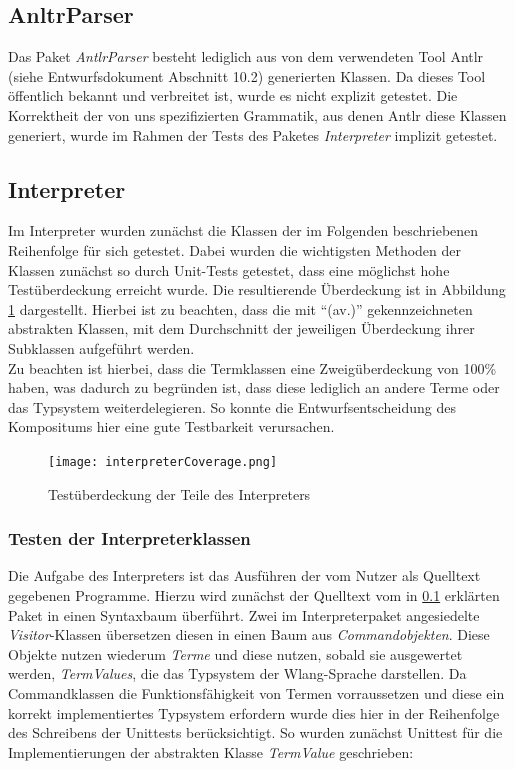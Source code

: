 \documentclass[parskip=full]{scrartcl}
\begin{document}
\subsection{AnltrParser}\label{ANTLRPARSER}
Das Paket \textit{AntlrParser} besteht lediglich aus von dem verwendeten Tool Antlr (siehe Entwurfsdokument Abschnitt 10.2) generierten Klassen. Da dieses Tool öffentlich bekannt und verbreitet ist, wurde es nicht explizit getestet. Die Korrektheit der von uns spezifizierten Grammatik, aus denen Antlr diese Klassen generiert, wurde im Rahmen der Tests des Paketes \textit{Interpreter} implizit getestet.
\subsection{Interpreter}
Im Interpreter wurden zunächst die Klassen der im Folgenden beschriebenen Reihenfolge für sich getestet. 
Dabei wurden die wichtigsten Methoden der Klassen zunächst so durch Unit-Tests getestet, dass eine möglichst hohe Testüberdeckung erreicht wurde. Die resultierende Überdeckung ist in Abbildung \ref{AbdeckungImInterpreter} dargestellt. Hierbei ist zu beachten, dass die mit \enquote{(av.)} gekennzeichneten abstrakten Klassen, mit dem Durchschnitt der jeweiligen Überdeckung ihrer Subklassen aufgeführt werden. \\ Zu beachten ist hierbei, dass die Termklassen eine Zweigüberdeckung von 100\% haben, was dadurch zu begründen ist, dass diese lediglich an andere Terme oder das Typsystem weiterdelegieren. So konnte die Entwurfsentscheidung des Kompositums hier eine gute Testbarkeit verursachen.
\begin{figure}[!h]
\centering
\texttt{[image: interpreterCoverage.png]}
\caption{Testüberdeckung der Teile des Interpreters}\label{AbdeckungImInterpreter}
\end{figure}


\subsubsection{Testen der Interpreterklassen}
Die Aufgabe des Interpreters ist das Ausführen der vom Nutzer als Quelltext gegebenen Programme. Hierzu wird zunächst der Quelltext vom in \ref{ANTLRPARSER} erklärten Paket in einen Syntaxbaum überführt.
Zwei im Interpreterpaket angesiedelte \textit{Visitor}-Klassen übersetzen diesen in einen Baum aus \textit{Commandobjekten}. Diese Objekte nutzen wiederum \textit{Terme} und diese nutzen, sobald sie ausgewertet werden, \textit{TermValues}, die das Typsystem der Wlang-Sprache darstellen. 
Da Commandklassen die Funktionsfähigkeit von Termen vorraussetzen und diese ein korrekt implementiertes Typsystem erfordern wurde dies hier in der Reihenfolge des Schreibens der Unittests berücksichtigt.
So wurden zunächst Unittest für die Implementierungen der abstrakten Klasse \textit{TermValue} geschrieben:
\end{document}
